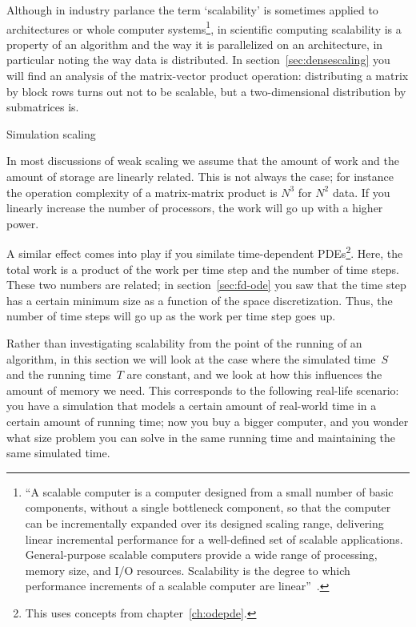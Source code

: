 Although in industry parlance the term `scalability' is sometimes
applied to architectures or whole computer systems\footnote {``A
  scalable computer is a computer designed from a small number of
  basic components, without a single bottleneck component, so that
  the computer can be incrementally expanded over its designed scaling
  range, delivering linear incremental performance for a well-defined
  set of scalable applications.  General-purpose scalable computers
  provide a wide range of processing, memory size, and I/O
  resources.  Scalability is the degree to which performance
  increments of a scalable computer are linear''~\cite{Bell:outlook}.},
%
in scientific computing
scalability is a property of an algorithm and the way it is
parallelized on an architecture, in
particular noting the way data is distributed. In
section~\ref{sec:densescaling} you will find an analysis of the
matrix-vector product operation: distributing a matrix by block rows
turns out not to be scalable, but a two-dimensional distribution by
submatrices is.

 {Simulation scaling}

In most discussions of weak scaling
we assume that the amount of work and 
the amount of storage are linearly related. This is not always the case; for instance
the operation complexity of a matrix-matrix product is $N^3$ for $N^2$ data.
If you linearly increase the number of processors, the work will go up with a higher power.

A similar effect comes into play if you similate time-dependent \acp{PDE}\footnote
{This uses concepts from chapter~\ref{ch:odepde}.}.
Here, the total work is a product of the work per time step and the number of 
time steps. These two numbers are related; in section~\ref{sec:fd-ode} you
saw that the time step has a certain minimum size as a function of the 
space discretization. Thus, the number of time steps will go up as the work per
time step goes up.

Rather than investigating scalability from the point of the running
of an algorithm, in this section we will look at the case where the simulated time~$S$
and the running time~$T$ are constant, and we look at how this influences the amount of
memory we need. This corresponds to the following real-life scenario: 
you have a simulation that models a certain amount of real-world time 
in a certain amount of running time; now you buy a bigger computer, and you wonder
what size problem you can solve in the same running time and maintaining
the same simulated time.

